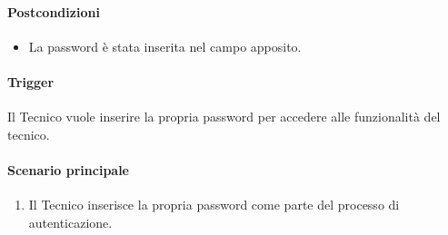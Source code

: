 \paragraph*{Postcondizioni}
\begin{itemize}
  \item La password è stata inserita nel campo apposito.
\end{itemize}

\paragraph*{Trigger}
Il Tecnico vuole inserire la propria password per accedere alle funzionalità del tecnico.

\paragraph*{Scenario principale}
\begin{enumerate}
  \item Il Tecnico inserisce la propria password come parte del processo di autenticazione.
\end{enumerate}